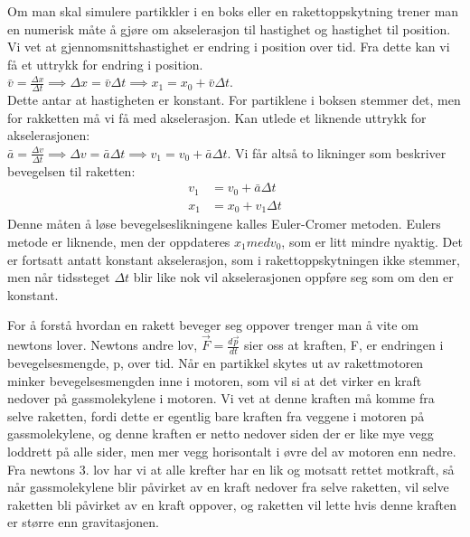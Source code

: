 \documentclass[reprint,english,notitlepage]{revtex4-1}
\begin{document}
	Om man skal simulere partikkler i en boks eller en rakettoppskytning trener man
	en numerisk måte å gjøre om akselerasjon til hastighet og hastighet til position.
	Vi vet at gjennomsnittshastighet er endring i position over tid. Fra dette kan
	vi få et uttrykk for endring i position. \\
	$\bar{v} = \frac{\Delta x}{\Delta t} \implies \Delta x = \bar{v}\Delta t \implies x_1 = x_0 + \bar{v}\Delta t$. \\
	Dette antar at hastigheten er konstant. For partiklene i boksen stemmer det,
	men for rakketten må vi få med akselerasjon. Kan utlede et liknende uttrykk for akselerasjonen: \\
	$\bar{a} = \frac{\Delta v}{\Delta t} \implies \Delta v = \bar{a}\Delta t \implies v_1 = v_0 + \bar{a}\Delta t$.
	Vi får altså to likninger som beskriver bevegelsen til raketten:
	\begin{align*}
		v_1 &= v_0 + \bar{a}\Delta t \\
		x_1 &= x_0 + v_1\Delta t
	\end{align*}
	Denne måten å løse bevegelseslikningene kalles Euler-Cromer metoden.
	Eulers metode er liknende, men der oppdateres $x_1 med v_0$, som er litt mindre
	nyaktig. Det er fortsatt antatt konstant akselerasjon, som i rakettoppskytningen
	ikke stemmer, men når tidssteget $\Delta t$ blir like nok vil akselerasjonen
	oppføre seg som om den er konstant.

	\vspace{0.5cm}

	For å forstå hvordan en rakett beveger seg oppover trenger man å vite om newtons lover.
	Newtons andre lov, $\vec{F} = \frac{d\vec{p}}{dt}$ sier oss at kraften, F, er endringen
	i bevegelsesmengde, p, over tid. Når en partikkel skytes ut av rakettmotoren minker
	bevegelsesmengden inne i motoren, som vil si at det virker en kraft nedover på gassmolekylene
	i motoren. Vi vet at denne kraften må komme fra selve raketten, fordi dette er egentlig bare
	kraften fra veggene i motoren på gassmolekylene, og denne kraften er netto nedover
	siden der er like mye vegg loddrett på alle sider, men mer vegg horisontalt i øvre del av
	motoren enn nedre. Fra newtons 3. lov har vi at alle krefter har en lik og motsatt
	rettet motkraft, så når gassmolekylene blir påvirket av en kraft nedover fra selve raketten,
	vil selve raketten bli påvirket av en kraft oppover, og raketten vil lette hvis denne
	kraften er større enn gravitasjonen.

	\vspace{0.5cm}
\end{document}
